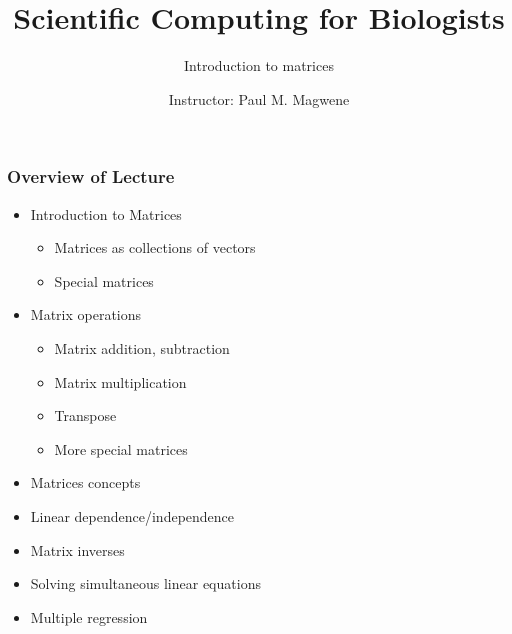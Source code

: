 \documentclass{beamer}
\title{Scientific Computing for Biologists}
\subtitle{Introduction to matrices} %
\author{Instructor: Paul M. Magwene}
\date{}
\begin{document}
\begin{frame}
\titlepage
\end{frame}

\begin{frame}
  \frametitle{Overview of Lecture}
  
\begin{itemize}
	\item Introduction to Matrices
		\begin{itemize}
			\item Matrices as collections of vectors
			\item Special matrices
		\end{itemize}
		\item Matrix operations
		\begin{itemize}
			\item Matrix addition, subtraction
			\item Matrix multiplication
		  \item Transpose			
		  \item More special matrices		  
		\end{itemize}		
	  \item Matrices concepts		
		\item Linear dependence/independence
		\item Matrix inverses		
		\item Solving simultaneous linear equations
	  \item Multiple regression
\end{itemize}

\end{frame}
\end{document}
